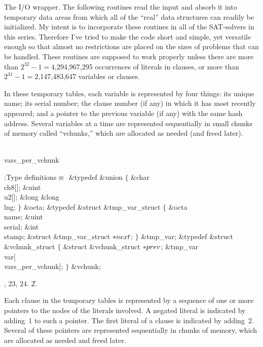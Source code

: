 The I/O wrapper. The following routines read the input and absorb it
into
temporary data areas from which all of the ``real'' data structures
can readily be initialized. My intent is to incorporate these routines in all
of the SAT-solvers in this series. Therefore I've tried to make the code
short and simple, yet versatile enough so that almost no restrictions are
placed on the sizes of problems that can be handled. These routines are
supposed to work properly unless there are more than
$2^{32}-1=4$,294,967,295 occurrences of literals in clauses,
or more than $2^{31}-1=2$,147,483,647 variables or clauses.

In these temporary tables, each variable is represented by four things:
its unique name; its serial number; the clause number (if any) in which it has
most recently appeared; and a pointer to the previous variable (if any)
with the same hash address. Several variables at a time
are represented sequentially in small chunks of memory called ``vchunks,''
which are allocated as needed (and freed later).

\Y\B\4\D\\{vars\_per\_vchunk}\5
\par
\Y\B\4:Type definitions\X${}\equiv{}$\6
\&{typedef} \&{union} ${}\{{}$\1\6
\&{char} \\{ch8}[];\6
\&{uint} \\{u2}[];\6
\&{long} \&{long} \\{lng};\2\6
${}\}{}$ \&{octa};\6
\&{typedef} \&{struct} \&{tmp\_var\_struct} ${}\{{}$\1\6
\&{octa} \\{name};\6
\&{uint} \\{serial};\6
\&{int} \\{stamp};\6
\&{struct} \&{tmp\_var\_struct} ${}{*}\\{next}{}$;\2%
\6
${}\}{}$ \&{tmp\_var};\7
\&{typedef} \&{struct} \&{vchunk\_struct} ${}\{{}$\1\6
\&{struct} \&{vchunk\_struct} ${}{*}\\{prev}{}$;\6
\&{tmp\_var} \\{var}[\\{vars\_per\_vchunk}];\2\6
${}\}{}$ \&{vchunk};\par
{}, 23, 24.
\U2.\fi

Each clause in the temporary tables is represented by a sequence of
one or more pointers to the  nodes of the literals involved.
A negated literal is indicated by adding~1 to such a pointer.
The first literal of a clause is indicated by adding~2.
Several of these pointers are represented sequentially in chunks
of memory, which are allocated as needed and freed later.


